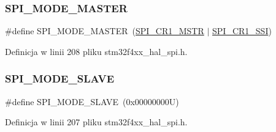 \subsubsection{\texorpdfstring{S\+P\+I\+\_\+\+M\+O\+D\+E\+\_\+\+M\+A\+S\+T\+ER}{SPI\_MODE\_MASTER}}
{\footnotesize\ttfamily \#define S\+P\+I\+\_\+\+M\+O\+D\+E\+\_\+\+M\+A\+S\+T\+ER~(\hyperlink{group___peripheral___registers___bits___definition_ga5b3b6ae107fc37bf18e14506298d7a55}{S\+P\+I\+\_\+\+C\+R1\+\_\+\+M\+S\+TR} $\vert$ \hyperlink{group___peripheral___registers___bits___definition_ga5f154374b58c0234f82ea326cb303a1e}{S\+P\+I\+\_\+\+C\+R1\+\_\+\+S\+SI})}



Definicja w linii 208 pliku stm32f4xx\+\_\+hal\+\_\+spi.\+h.

\mbox{\label{group___s_p_i___mode_ga75f094fee5a9dc10b88401ccd17925d3}} 
\subsubsection{\texorpdfstring{S\+P\+I\+\_\+\+M\+O\+D\+E\+\_\+\+S\+L\+A\+VE}{SPI\_MODE\_SLAVE}}
{\footnotesize\ttfamily \#define S\+P\+I\+\_\+\+M\+O\+D\+E\+\_\+\+S\+L\+A\+VE~(0x00000000\+U)}



Definicja w linii 207 pliku stm32f4xx\+\_\+hal\+\_\+spi.\+h.


